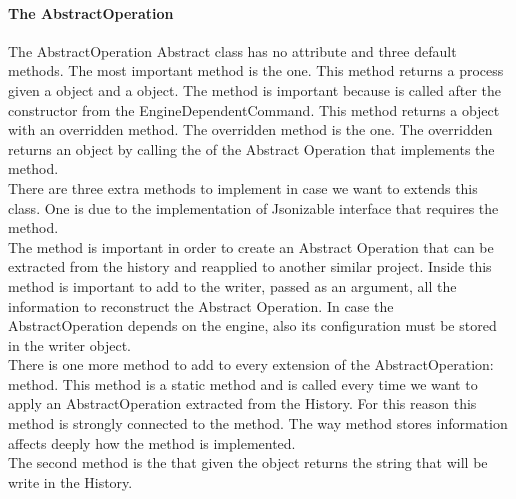\paragraph{The AbstractOperation} The AbstractOperation Abstract class has no attribute and three default methods. The most important method is the  one. This method returns a process given a  object and a  object. The  method is important because is called after the constructor from the EngineDependentCommand. This method returns a  object with an overridden method. The overridden method is the  one. The overridden  returns an  object by calling the  of the Abstract Operation that implements the  method. \\
There are three extra methods to implement in case we want to extends this class. One is due to the implementation of Jsonizable interface that requires the  method.\\
The  method is important in order to create an Abstract Operation that can be extracted from the history and reapplied to another similar project. Inside this method is important to add to the writer, passed as an argument, all the information to reconstruct the Abstract Operation. In case the AbstractOperation depends on the engine, also its configuration must be stored in the writer object.\\ There is one more method to add to every extension of the AbstractOperation:  method. This method is a static method and is called every time we want to apply an AbstractOperation extracted from the History. For this reason this method is strongly connected to the  method. The way method stores information affects deeply how the  method is implemented.\\
The second method is the  that given the  object returns the string that will be write in the History.
